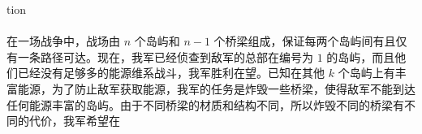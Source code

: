 {tion\\\\在一场战争中，战场由 $n$ 个岛屿和 $n-1$ 个桥梁组成，保证每两个岛屿间有且仅有一条路径可达。现在，我军已经侦查到敌军的总部在编号为 $1$ 的岛屿，而且他们已经没有足够多的能源维系战斗，我军胜利在望。已知在其他 $k$ 个岛屿上有丰富能源，为了防止敌军获取能源，我军的任务是炸毁一些桥梁，使得敌军不能到达任何能源丰富的岛屿。由于不同桥梁的材质和结构不同，所以炸毁不同的桥梁有不同的代价，我军希望在}
